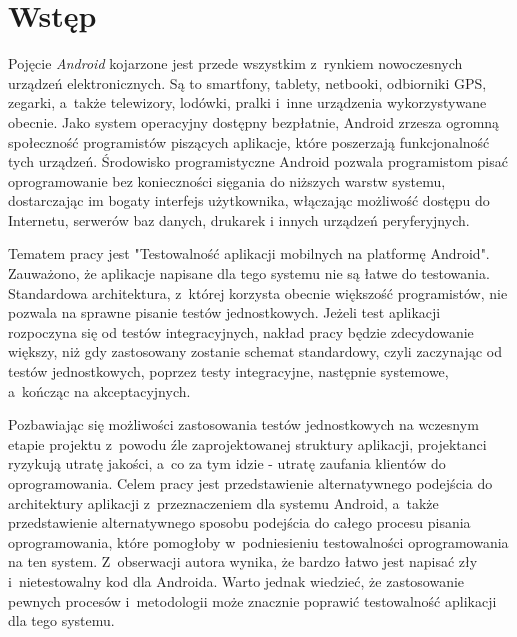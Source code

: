 \chapter*{Wstęp}
\label{wstep}

Pojęcie \textit{Android} kojarzone jest przede wszystkim z~rynkiem nowoczesnych urządzeń elektronicznych. Są to smartfony, tablety, netbooki, odbiorniki GPS, zegarki, a~także telewizory, lodówki, pralki i~inne urządzenia wykorzystywane obecnie. Jako system operacyjny dostępny bezpłatnie, Android zrzesza ogromną społeczność programistów piszących aplikacje, które poszerzają funkcjonalność tych urządzeń. Środowisko programistyczne Android pozwala programistom pisać oprogramowanie bez konieczności sięgania do niższych warstw systemu, dostarczając im bogaty interfejs użytkownika, włączając możliwość dostępu do Internetu, serwerów baz danych, drukarek i innych urządzeń peryferyjnych. 

Tematem pracy jest "Testowalność aplikacji mobilnych na platformę Android". Zauważono, że aplikacje napisane dla tego systemu nie są łatwe do testowania. Standardowa architektura, z~której korzysta obecnie większość programistów, nie pozwala na sprawne pisanie testów jednostkowych. Jeżeli test aplikacji rozpoczyna się od testów integracyjnych, nakład pracy będzie zdecydowanie większy, niż gdy zastosowany zostanie schemat standardowy, czyli zaczynając od testów jednostkowych, poprzez testy integracyjne, następnie systemowe, a~kończąc na akceptacyjnych. 

Pozbawiając się możliwości zastosowania testów jednostkowych na wczesnym etapie projektu z~powodu źle zaprojektowanej struktury aplikacji, projektanci ryzykują utratę jakości, a~co za tym idzie - utratę zaufania klientów do oprogramowania. Celem pracy jest przedstawienie alternatywnego podejścia do architektury aplikacji z~przeznaczeniem dla systemu Android, a~także przedstawienie alternatywnego sposobu podejścia do całego procesu pisania oprogramowania, które pomogłoby w~podniesieniu testowalności oprogramowania na ten system. Z~obserwacji autora wynika, że bardzo łatwo jest napisać zły i~nietestowalny kod dla Androida. Warto jednak wiedzieć, że zastosowanie pewnych procesów i~metodologii może znacznie poprawić testowalność aplikacji dla tego systemu. 

